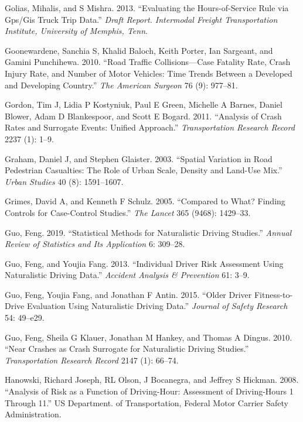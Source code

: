 \documentclass[12pt]{book}
\numberwithin{equation}{chapter}
\begin{document}
\leavevmode\hypertarget{ref-golias2013evaluating}{}%
Golias, Mihalis, and S Mishra. 2013. ``Evaluating the Hours-of-Service Rule via Gps/Gis Truck Trip Data.'' \emph{Draft Report. Intermodal Freight Transportation Institute, University of Memphis, Tenn}.

\leavevmode\hypertarget{ref-goonewardene2010road}{}%
Goonewardene, Sanchia S, Khalid Baloch, Keith Porter, Ian Sargeant, and Gamini Punchihewa. 2010. ``Road Traffic Collisions---Case Fatality Rate, Crash Injury Rate, and Number of Motor Vehicles: Time Trends Between a Developed and Developing Country.'' \emph{The American Surgeon} 76 (9): 977--81.

\leavevmode\hypertarget{ref-gordon2011analysis}{}%
Gordon, Tim J, Lidia P Kostyniuk, Paul E Green, Michelle A Barnes, Daniel Blower, Adam D Blankespoor, and Scott E Bogard. 2011. ``Analysis of Crash Rates and Surrogate Events: Unified Approach.'' \emph{Transportation Research Record} 2237 (1): 1--9.

\leavevmode\hypertarget{ref-graham2003spatial}{}%
Graham, Daniel J, and Stephen Glaister. 2003. ``Spatial Variation in Road Pedestrian Casualties: The Role of Urban Scale, Density and Land-Use Mix.'' \emph{Urban Studies} 40 (8): 1591--1607.

\leavevmode\hypertarget{ref-grimes2005compared}{}%
Grimes, David A, and Kenneth F Schulz. 2005. ``Compared to What? Finding Controls for Case-Control Studies.'' \emph{The Lancet} 365 (9468): 1429--33.

\leavevmode\hypertarget{ref-guo2019statistical}{}%
Guo, Feng. 2019. ``Statistical Methods for Naturalistic Driving Studies.'' \emph{Annual Review of Statistics and Its Application} 6: 309--28.

\leavevmode\hypertarget{ref-guo2013individual}{}%
Guo, Feng, and Youjia Fang. 2013. ``Individual Driver Risk Assessment Using Naturalistic Driving Data.'' \emph{Accident Analysis \& Prevention} 61: 3--9.

\leavevmode\hypertarget{ref-guo2015older}{}%
Guo, Feng, Youjia Fang, and Jonathan F Antin. 2015. ``Older Driver Fitness-to-Drive Evaluation Using Naturalistic Driving Data.'' \emph{Journal of Safety Research} 54: 49--e29.

\leavevmode\hypertarget{ref-guo2010near}{}%
Guo, Feng, Sheila G Klauer, Jonathan M Hankey, and Thomas A Dingus. 2010. ``Near Crashes as Crash Surrogate for Naturalistic Driving Studies.'' \emph{Transportation Research Record} 2147 (1): 66--74.

\leavevmode\hypertarget{ref-hanowski2008analysis}{}%
Hanowski, Richard Joseph, RL Olson, J Bocanegra, and Jeffrey S Hickman. 2008. ``Analysis of Risk as a Function of Driving-Hour: Assessment of Driving-Hours 1 Through 11.'' US Department. of Transportation, Federal Motor Carrier Safety Administration.
\end{document}

